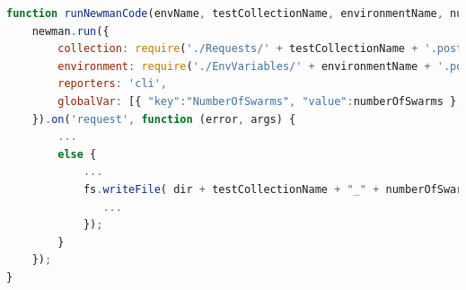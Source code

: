 \documentclass[oneside,12pt]{book}
\begin{document}
\begin{lstlisting}[basicstyle=\footnotesize, language=JavaScript]
function runNewmanCode(envName, testCollectionName, environmentName, numberOfSwarms, numberOfParticles, baseUrlsSting, endpoint) {
    newman.run({
        collection: require('./Requests/' + testCollectionName + '.postman_collection.json'),
        environment: require('./EnvVariables/' + environmentName + '.postman_environment.json'),
        reporters: 'cli',
        globalVar: [{ "key":"NumberOfSwarms", "value":numberOfSwarms }, {"key":"endpoint", "value": endpoint}, { "key":"NumberOfParticles", "value": numberOfParticles}, { "key":"BaseUrls", "value": baseUrlsSting}]
    }).on('request', function (error, args) {
        ...
        else {
            ...
            fs.writeFile( dir + testCollectionName + "_" + numberOfSwarms + "_" + numberOfParticles + '.result.json', args.response.stream, function (error) {
               ...
            });
        }
    });
}
\end{lstlisting}
\label{listing:NewmanImpl}
\end{document}
